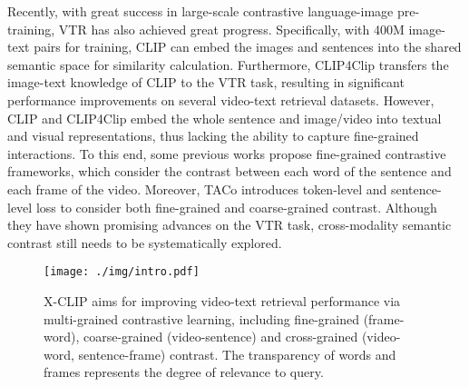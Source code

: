 \documentclass[sigconf]{acmart}
\begin{document}
Recently, with great success in large-scale contrastive language-image pre-training, VTR has also achieved great progress.  Specifically, with 400M image-text pairs for training, CLIP \cite{radford2021learning} can embed the images and sentences into the shared semantic space for similarity calculation. Furthermore, CLIP4Clip \cite{luo2021clip4clip} transfers the image-text knowledge of CLIP to the VTR task, resulting in significant performance improvements on several video-text retrieval datasets. However, CLIP and CLIP4Clip embed the whole sentence and image/video into textual and visual representations, thus lacking the ability to capture fine-grained interactions. To this end, some previous works \cite{yao2021filip,lee2018stacked} propose fine-grained contrastive frameworks, which consider the contrast between each word of the sentence and each frame of the video. Moreover, TACo \cite{yang2021taco} introduces token-level and sentence-level loss to consider both fine-grained and coarse-grained contrast. Although they have shown promising advances on the VTR task, cross-modality semantic contrast still needs to be systematically explored.



\begin{figure}
\centering 
  \texttt{[image: ./img/intro.pdf]}
  \vspace{-0.3cm}
  \caption{X-CLIP aims for improving video-text retrieval performance via multi-grained contrastive learning, including \textcolor{myorange}{fine-grained (frame-word)}, \textcolor{mygreen}{coarse-grained (video-sentence)}  and \textcolor{myblue}{cross-grained (video-word, sentence-frame)} contrast. The transparency of words and frames represents the degree of relevance to query.}
  \vspace{-0.3cm}
  \label{fig:intro}
\end{figure}
\end{document}
